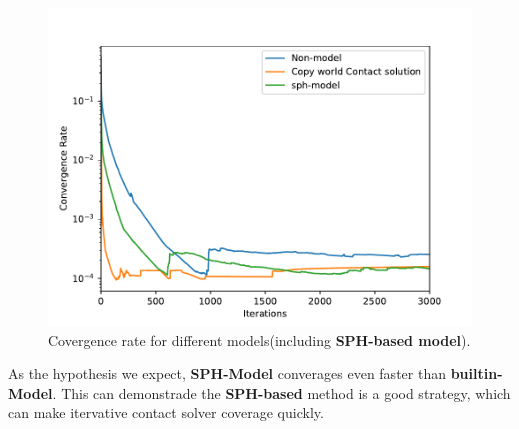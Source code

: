     \begin{figure}
        \centering
        \includegraphics[width=\textwidth]{Figures/addsph}
        \caption{Covergence rate for different models(including \textbf{SPH-based model}).}
        \label{fg:addsph}
    \end{figure}
    As the hypothesis we expect, \textbf{SPH-Model} converages even faster than \textbf{builtin-Model}. This can demonstrade the \textbf{SPH-based} method is a good strategy, which can make itervative contact solver coverage quickly.
